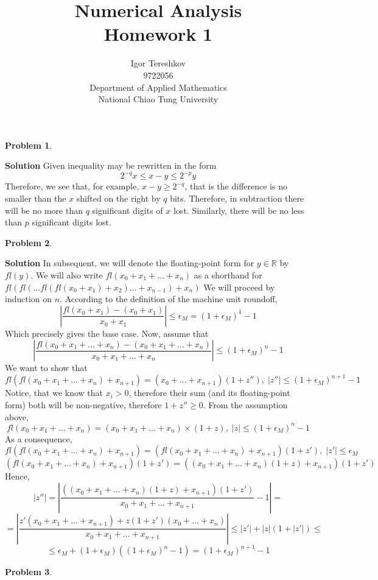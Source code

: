 \documentclass[8pt]{article} %
\title{Numerical Analysis\\Homework 1}
\author{Igor Tereshkov\\9722056\\Department of Applied Mathematics\\National Chiao Tung University}
\newtheorem{prob}{Problem}
\newenvironment{solution}%
{\par\textbf{Solution}\space }%
{\par}
\begin{document}
\begin{CJK}{UTF8}{bsmi}
\maketitle
\end{CJK}

\begin{prob}
\end{prob}
\begin{solution}
	Given inequality may be rewritten in the form \[2^{-q}x\leq x-y \leq 2^{-p}y\]
	Therefore, we see that, for example, $x-y \geq 2^{-q}$, that is the difference is no smaller than the $x$ shifted on the right by $q$
	bits. Therefore, in subtraction there will be no more than $q$ significant digits of $x$ lost. Similarly, there will be no less than 
	$p$ significant digits lost.
\end{solution}
\begin{prob}
\end{prob}
\begin{solution}
	In subsequent, we will denote the floating-point form for $y\in\mathbb{R}$ by $fl(y)$. We will also write
	$fl(x_0+x_1+\dots+x_n)$ as a shorthand for $fl(fl(\dots fl(fl(x_0+x_1)+x_2)\dots+x_{n-1})+x_n)$
	We will proceed by induction on $n$. According to the definition of the machine unit roundoff,
	\[|\frac{fl(x_0+x_1)-(x_0+x_1)}{x_0+x_1}|\leq \epsilon_M=(1+\epsilon_M)^1-1\]
	Which precisely gives the base case. Now, assume that
	\[|\frac{fl(x_0+x_1+\dots+x_n)-(x_0+x_1+\dots+x_n)}{x_0+x_1+\dots+x_n}|\leq (1+\epsilon_M)^n-1\]
	We want to show that
	\[fl(fl(x_0+x_1+\dots+x_n)+x_{n+1})=(x_0+\dots+x_{n+1})(1+z''),\;|z''|\leq (1+\epsilon_M)^{n+1}-1\]
	Notice, that we know that $x_i>0$, therefore their sum (and its floating-point form) both will be non-negative, therefore $1+z''\geq0$.
	From the assumption above,
	\[fl(x_0+x_1+\dots+x_n)=(x_0+x_1+\dots+x_n)\times(1+z),\;|z|\leq (1+\epsilon_M)^n-1\]
	As a consequence,
	\[fl(fl(x_0+x_1+\dots+x_n)+x_{n+1})=(fl(x_0+x_1+\dots+x_n)+x_{n+1})(1+z'),\;|z'|\leq \epsilon_M\]
	\[(fl(x_0+x_1+\dots+x_n)+x_{n+1})(1+z')=((x_0+x_1+\dots+x_n)(1+z)+x_{n+1})(1+z')\]
	Hence,
	\[|z''|=|\frac{((x_0+x_1+\dots+x_n)(1+z)+x_{n+1})(1+z')}{x_0+x_1+\dots+x_{n+1}}-1|=\]
	\[=|\frac{z'(x_0+x_1+\dots+x_{n+1})+z(1+z')(x_0+\dots+x_n)}{{x_0+x_1+\dots+x_{n+1}}}|\leq |z'|+|z|(1+|z'|)\leq\] 
	\[\leq\epsilon_M+(1+\epsilon_M)((1+\epsilon_M)^n-1)=(1+\epsilon_M)^{n+1}-1\]
\end{solution}
\begin{prob}
\end{prob}
\end{document}
